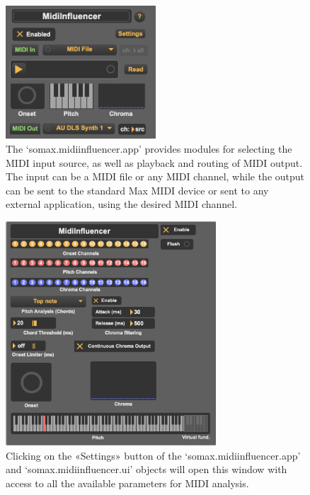 \begin{figure}[H]
    \centering        
 	\includegraphics[width=0.5\textwidth, keepaspectratio]{img/midiinfluencer_app.png}
    \caption{The `somax.midiinfluencer.app' provides modules for selecting the MIDI input source, as well as playback and routing of MIDI output. The input can be a MIDI file or any MIDI channel, while the output can be sent to the standard Max MIDI device or sent to any external application, using the desired MIDI channel.}
    \label{fig:midiinfluencer_app}
\end{figure}



 \begin{figure}[H]
    \centering        
 	\includegraphics[width=0.7\textwidth, keepaspectratio]{img/midiinfluencer_settings.png}
    \caption{Clicking on the «Settings» button of the `somax.midiinfluencer.app' and `somax.midiinfluencer.ui' objects will open this window with access to all the available parameters for MIDI analysis.}
    \label{fig:midiinfluencer_settings}
\end{figure}


